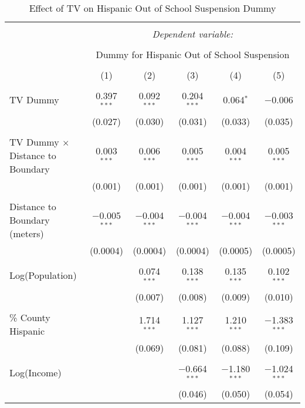 
\begin{table}[!htbp] \centering 
  \caption{Effect of TV on Hispanic Out of School Suspension Dummy} 
  \label{} 
\begin{tabular}{@{\extracolsep{-2pt}}lccccc} 
\\[-1.8ex]\hline 
\hline \\[-1.8ex] 
 & \multicolumn{5}{c}{\textit{Dependent variable:}} \\ 
\cline{2-6} 
\\[-1.8ex] & \multicolumn{5}{c}{Dummy for Hispanic Out of School Suspension} \\ 
\\[-1.8ex] & (1) & (2) & (3) & (4) & (5)\\ 
\hline \\[-1.8ex] 
 TV Dummy & 0.397$^{***}$ & 0.092$^{***}$ & 0.204$^{***}$ & 0.064$^{*}$ & $-$0.006 \\ 
  & (0.027) & (0.030) & (0.031) & (0.033) & (0.035) \\ 
  & & & & & \\ 
 TV Dummy $\times$ Distance to Boundary & 0.003$^{***}$ & 0.006$^{***}$ & 0.005$^{***}$ & 0.004$^{***}$ & 0.005$^{***}$ \\ 
  & (0.001) & (0.001) & (0.001) & (0.001) & (0.001) \\ 
  & & & & & \\ 
 Distance to Boundary (meters) & $-$0.005$^{***}$ & $-$0.004$^{***}$ & $-$0.004$^{***}$ & $-$0.004$^{***}$ & $-$0.003$^{***}$ \\ 
  & (0.0004) & (0.0004) & (0.0004) & (0.0005) & (0.0005) \\ 
  & & & & & \\ 
 Log(Population) &  & 0.074$^{***}$ & 0.138$^{***}$ & 0.135$^{***}$ & 0.102$^{***}$ \\ 
  &  & (0.007) & (0.008) & (0.009) & (0.010) \\ 
  & & & & & \\ 
 \% County Hispanic &  & 1.714$^{***}$ & 1.127$^{***}$ & 1.210$^{***}$ & $-$1.383$^{***}$ \\ 
  &  & (0.069) & (0.081) & (0.088) & (0.109) \\ 
  & & & & & \\ 
 Log(Income) &  &  & $-$0.664$^{***}$ & $-$1.180$^{***}$ & $-$1.024$^{***}$ \\ 
  &  &  & (0.046) & (0.050) & (0.054) \\ 

\end{tabular}
\end{table}
